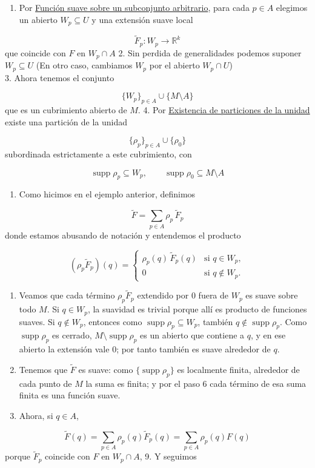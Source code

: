 \begin{bookproof}{}
\begin{enumerate}
\item Por \hyperref[blk:cf02ec]{Función suave sobre un subconjunto arbitrario}, para cada $p\in A$ elegimos un abierto $W_p\subseteq U$ y una extensión suave local
\end{enumerate}
\[
\widetilde F_p:W_p\to\mathbb R^k
\]
que coincide con $F$ en $W_{p}\cap A$ 2. Sin perdida de generalidades podemos suponer $W_{p}\subseteq U$ (En otro caso, cambiamos $W_{p}$ por el abierto $W_{p}\cap U$)\\
3. Ahora tenemos el conjunto

\[
\{W_p\}_{p\in A}\cup\{M\setminus A\}
\]
que es un cubrimiento abierto de $M$. 4. Por \hyperref[blk:eafe2b]{Existencia de particiones de la unidad} existe una partición de la unidad

\[
\{\rho_p\}_{p\in A}\cup\{\rho_0\}
\]
subordinada estrictamente a este cubrimiento, con

\[
\operatorname{supp}\rho_p\subseteq W_p, \qquad \operatorname{supp}\rho_0\subseteq M\setminus A
\]
\begin{enumerate}[start=5]
\item Como hicimos en el ejemplo anterior, definimos
\end{enumerate}
\[
\widetilde F=\sum_{p\in A}\rho_p\,\widetilde F_p
\]
donde estamos abusando de notación y entendemos el producto

\[
(\rho_p\widetilde{F}_p)(q)=\begin{cases}\rho_p(q)\,\widetilde{F}_p(q)&\text{si }q\in W_p,\\0&\text{si }q\notin W_p.\end{cases}
\]
\begin{enumerate}[start=6]
\item Veamos que cada término $\rho_p\widetilde F_p$ extendido por $0$ fuera de $W_p$ es suave sobre todo $M$. Si $q\in W_p$, la suavidad es trivial porque allí es producto de funciones suaves. Si $q\notin W_p$, entonces como $\operatorname{supp}\rho_p\subseteq W_p$, también $q\notin\operatorname{supp}\rho_p$. Como $\operatorname{supp}\rho_p$ es cerrado, $M\setminus\operatorname{supp}\rho_p$ es un abierto que contiene a $q$, y en ese abierto la extensión vale $0$; por tanto también es suave alrededor de $q$.
\item Tenemos que $\widetilde{F}$ es suave: como $\{\operatorname{supp}\rho_p\}$ es localmente finita, alrededor de cada punto de $M$ la suma es finita; y por el paso 6 cada término de esa suma finita es una función suave.
\item Ahora, si $q\in A$,
\end{enumerate}
\[
\widetilde{F}(q)=\sum_{p\in A}\rho_p(q)\widetilde{F}_p(q)=\sum_{p\in A}\rho_p(q)F(q)
\]
porque $\widetilde{F}_p$ coincide con $F$ en $W_p\cap A$, 9. Y seguimos


\end{bookproof}
